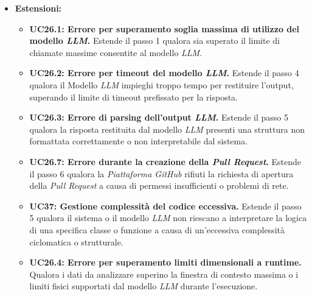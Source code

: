 \documentclass[12pt, a4paper]{article}
\begin{document}
\begin{itemize}
\begin{enumerate}
        \item Il sistema compone il prompt contestuale, includendo le porzioni di codice rilevate, e lo invia alle \textit{API} del Modello \textit{LLM} richiedendo la generazione della documentazione inline appropriata.
        \item Il modello \textit{LLM} elabora il codice e restituisce al sistema le proposte di commento standardizzato (\textit{JSDoc}) per gli elementi analizzati.
        \item Il sistema effettua una chiamata alle \textit{API} della \textit{Piattaforma GitHub} per aprire una \textit{Pull Request} contenente le proposte di documentazione inline integrate nel codice.
        \item Il sistema registra il successo dell'attività, ne aggiorna lo stato a "Completato" nella dashboard di monitoraggio (UC22.1.2) e rende disponibile allo Sviluppatore il report dell'operazione (UC25).
    \end{enumerate}
    \item \textbf{Estensioni:}
    \begin{itemize}
        \item \textbf{UC26.1: Errore per superamento soglia massima di utilizzo del modello \textit{LLM}.} Estende il passo 1 qualora sia superato il limite di chiamate massime consentite al modello \textit{LLM}.
        \item \textbf{UC26.2: Errore per timeout del modello \textit{LLM}.} Estende il passo 4 qualora il Modello \textit{LLM} impieghi troppo tempo per restituire l'output, superando il limite di timeout prefissato per la risposta.
        \item \textbf{UC26.3: Errore di parsing dell'output \textit{LLM}.} Estende il passo 5 qualora la risposta restituita dal modello \textit{LLM} presenti una struttura non formattata correttamente o non interpretabile dal sistema.
        \item \textbf{UC26.7: Errore durante la creazione della \textit{Pull Request}.} Estende il passo 6 qualora la \textit{Piattaforma GitHub} rifiuti la richiesta di apertura della \textit{Pull Request} a causa di permessi insufficienti o problemi di rete.
        \item \textbf{UC37: Gestione complessità del codice eccessiva.} Estende il passo 5 qualora il sistema o il modello \textit{LLM} non riescano a interpretare la logica di una specifica classe o funzione a causa di un'eccessiva complessità ciclomatica o strutturale.
        \item \textbf{UC26.4: Errore per superamento limiti dimensionali a runtime.} Qualora i dati da analizzare superino la finestra di contesto massima o i limiti fisici supportati dal modello \textit{LLM} durante l'esecuzione.
    \end{itemize}
\end{itemize}
\end{document}
